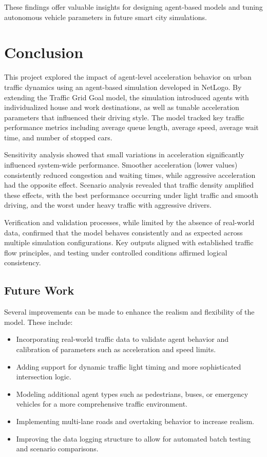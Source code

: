 \documentclass[12pt]{article}
\begin{document}
These findings offer valuable insights for designing agent-based models and tuning autonomous vehicle parameters in future smart city simulations.

\newpage
\section{Conclusion}

This project explored the impact of agent-level acceleration behavior on urban traffic dynamics using an agent-based simulation developed in NetLogo. By extending the Traffic Grid Goal model, the simulation introduced agents with individualized house and work destinations, as well as tunable acceleration parameters that influenced their driving style. The model tracked key traffic performance metrics including average queue length, average speed, average wait time, and number of stopped cars.

Sensitivity analysis showed that small variations in acceleration significantly influenced system-wide performance. Smoother acceleration (lower values) consistently reduced congestion and waiting times, while aggressive acceleration had the opposite effect. Scenario analysis revealed that traffic density amplified these effects, with the best performance occurring under light traffic and smooth driving, and the worst under heavy traffic with aggressive drivers.

Verification and validation processes, while limited by the absence of real-world data, confirmed that the model behaves consistently and as expected across multiple simulation configurations. Key outputs aligned with established traffic flow principles, and testing under controlled conditions affirmed logical consistency.

\subsection{Future Work}

Several improvements can be made to enhance the realism and flexibility of the model. These include:

\begin{itemize}
    \item Incorporating real-world traffic data to validate agent behavior and calibration of parameters such as acceleration and speed limits.
    \item Adding support for dynamic traffic light timing and more sophisticated intersection logic.
    \item Modeling additional agent types such as pedestrians, buses, or emergency vehicles for a more comprehensive traffic environment.
    \item Implementing multi-lane roads and overtaking behavior to increase realism.
    \item Improving the data logging structure to allow for automated batch testing and scenario comparisons.
\end{itemize}
\end{document}
